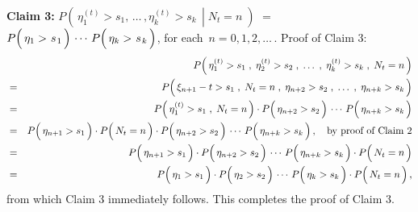 \vskip 0.5cm
\noindent
\textbf{Claim 3:}\quad
$P\!\left(\,\left.\eta^{(t)}_{1} > s_{1}, \,\ldots\, ,\eta^{(t)}_{k} > s_{k} \,\;\right\vert\; N_{t} = n\;\right)$\;
$=$
\;$P\!\left(\,\eta_{1} > \overset{{\color{white}-}}{s}_{1}\,\right) \,\cdots\, P\!\left(\,\eta_{k} > \overset{{\color{white}-}}{s}_{k}\,\right)$,\;\;
for each \,$n = 0, 1, 2, \ldots$\,.
\vskip 0.2cm
\noindent
Proof of Claim 3:\quad
\begin{eqnarray*}
&&
	P\!\left(\,\eta^{(t)}_{1} > s_{1} \;,\; \eta^{(t)}_{2} > s_{2} \;,\; \ldots \;,\; \eta^{(t)}_{k} > s_{k} \;,\; N_{t} = n\,\right)
\\
&=&
	P\!\left(\,
		\xi_{n+1} - t \overset{{\color{white}.}}{>} s_{1} \;,\; N_{t} = n \;,\; \eta_{n+2} > s_{2} \;,\; \ldots \;,\; \eta_{n+k} > s_{k}
		\,\right)
\\
&=&
	P\!\left(\,
		\eta^{(t)}_{1} \overset{{\color{white}.}}{>} s_{1} \;,\; N_{t} = n
		\,\right)
	\cdot
	P\!\left(\,
		\eta_{n+2} \overset{{\color{white}.}}{>} s_{2}
		\,\right)
	\,\cdots\,
	P\!\left(\,
		\eta_{n+k} \overset{{\color{white}.}}{>} s_{k}
		\,\right)
\\
&=&
	P\!\left(\,\eta_{n+1} \overset{{\color{white}.}}{>} s_{1}\,\right)
	\cdot
	P\!\left(\,N_{t} \overset{{\color{white}-}}{=} n \,\right)
	\cdot
	P\!\left(\,
		\eta_{n+2} \overset{{\color{white}.}}{>} s_{2}
		\,\right)
	\,\cdots\,
	P\!\left(\,
		\eta_{n+k} \overset{{\color{white}.}}{>} s_{k}
		\,\right),
	\quad
	\textnormal{by proof of Claim 2}
\\
&=&
	P\!\left(\,\eta_{n+1} \overset{{\color{white}.}}{>} s_{1}\,\right)
	\cdot
	P\!\left(\,
		\eta_{n+2} \overset{{\color{white}.}}{>} s_{2}
		\,\right)
	\,\cdots\,
	P\!\left(\,
		\eta_{n+k} \overset{{\color{white}.}}{>} s_{k}
		\,\right)
	\cdot
	P\!\left(\,N_{t} \overset{{\color{white}-}}{=} n \,\right)
\\
&=&
	P\!\left(\,\eta_{1} \overset{{\color{white}.}}{>} s_{1}\,\right)
	\cdot
	P\!\left(\,
		\eta_{2} \overset{{\color{white}.}}{>} s_{2}
		\,\right)
	\,\cdots\,
	P\!\left(\,
		\eta_{k} \overset{{\color{white}.}}{>} s_{k}
		\,\right)
	\cdot
	P\!\left(\,N_{t} \overset{{\color{white}-}}{=} n \,\right),
\end{eqnarray*}
from which Claim 3 immediately follows. This completes the proof of Claim 3.

